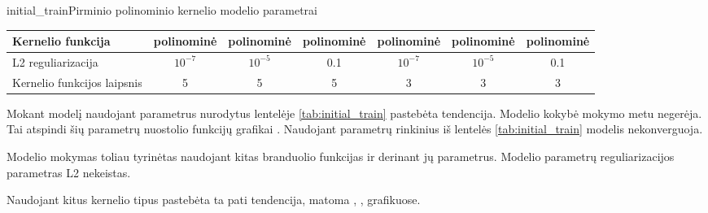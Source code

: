 \begin{ktutable}{initial_train}{Pirminio polinominio kernelio modelio parametrai}
    \begin{tabular}{| l | c | c | c | c | c | c | }
    \hline
        Kernelio funkcija & polinominė & polinominė & polinominė & polinominė & polinominė & polinominė \\ \hline
        L2 reguliarizacija & $10^{-7}$ & $10^{-5}$ & 0.1 & $10^{-7}$ & $10^{-5}$ & 0.1 \\ \hline
        Kernelio funkcijos laipsnis & 5 & 5 & 5 & 3 & 3 & 3 \\ \hline
    \end{tabular}
\end{ktutable}

Mokant modelį naudojant parametrus nurodytus lentelėje \vref{tab:initial_train} pastebėta tendencija. Modelio kokybė mokymo metu negerėja. Tai atspindi šių parametrų nuostolio funkcijų grafikai . Naudojant parametrų rinkinius iš lentelės \vref{tab:initial_train} modelis nekonverguoja.


Modelio mokymas toliau tyrinėtas naudojant kitas branduolio funkcijas ir derinant jų parametrus. Modelio parametrų reguliarizacijos parametras L2 nekeistas.


Naudojant kitus kernelio tipus pastebėta ta pati tendencija, matoma , ,  grafikuose.